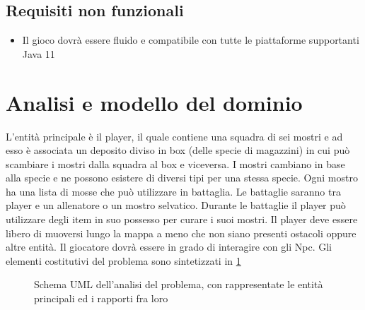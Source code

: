 \subsection*{Requisiti non funzionali}
\begin{itemize}
	\item Il gioco dovrà essere fluido e compatibile con tutte le piattaforme supportanti Java 11
\end{itemize}

\section{Analisi e modello del dominio}

L'entità principale è il player, il quale contiene una squadra di sei mostri e ad esso è associata un deposito diviso in box (delle specie di magazzini) in cui può scambiare i mostri dalla squadra al box e viceversa. 
I mostri cambiano in base alla specie e ne possono esistere di diversi tipi per una stessa specie. Ogni mostro ha una lista di mosse che può utilizzare in battaglia. Le battaglie saranno tra player e un allenatore o un mostro selvatico. Durante le battaglie il player può utilizzare degli item in suo possesso per curare i suoi mostri. Il player deve essere libero di muoversi lungo la mappa a meno che non siano presenti ostacoli oppure altre entità. Il giocatore dovrà essere in grado di interagire con gli Npc.
\newline
Gli elementi costitutivi del problema sono sintetizzati in \cref{img:uml}

\begin{figure}[!ht]
\centering

\caption{Schema UML dell'analisi del problema, con rappresentate le entità principali ed i rapporti fra loro}
\label{img:uml}
\end{figure}